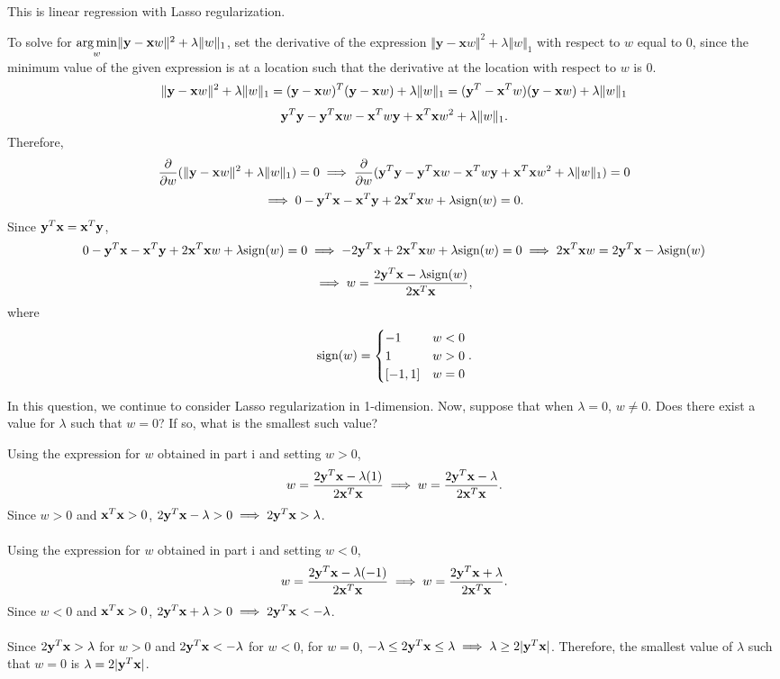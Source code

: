 This is linear regression with Lasso regularization.

To solve for $\underset{w}{\operatorname{arg\,min}} \Vert\mathbf{y} - \mathbf{x}w\Vert^2 + \lambda\Vert w\Vert_1$, set the derivative of the expression $\Vert\mathbf{y} - \mathbf{x}w\Vert^2 + \lambda\Vert w\Vert_1$ with respect to $w$ equal to 0, since the minimum value of the given expression is at a location such that the derivative at the location with respect to $w$ is 0.
\[ \Vert\mathbf{y} - \mathbf{x} w\Vert^2 + \lambda\Vert w\Vert_1 = (\mathbf{y} - \mathbf{x} w)^T(\mathbf{y} - \mathbf{x} w) + \lambda\Vert w\Vert_1 = (\mathbf{y}^T - \mathbf{x}^T w)(\mathbf{y} - \mathbf{x} w) + \lambda\Vert w\Vert_1 \]
\[ \mathbf{y}^T\mathbf{y} - \mathbf{y}^T\mathbf{x} w - \mathbf{x}^T w \mathbf{y} + \mathbf{x}^T\mathbf{x} w^2 + \lambda\Vert w\Vert_1. \]
Therefore,
\[ \frac{\partial}{\partial w}(\Vert\mathbf{y} - \mathbf{x} w\Vert^2 + \lambda\Vert w\Vert_1) = 0 \implies \frac{\partial}{\partial w}(\mathbf{y}^T\mathbf{y} - \mathbf{y}^T\mathbf{x} w - \mathbf{x}^T w \mathbf{y} + \mathbf{x}^T\mathbf{x} w^2 + \lambda\Vert w\Vert_1) = 0 \]
\[ \implies 0 - \mathbf{y}^T\mathbf{x} - \mathbf{x}^T\mathbf{y} + 2\mathbf{x}^T\mathbf{x} w + \lambda\text{sign}(w) = 0. \]
Since $\mathbf{y}^T\mathbf{x} = \mathbf{x}^T\mathbf{y}$,
\[ 0 - \mathbf{y}^T\mathbf{x} - \mathbf{x}^T\mathbf{y} + 2\mathbf{x}^T\mathbf{x} w + \lambda\text{sign}(w) = 0 \implies -2\mathbf{y}^T\mathbf{x} + 2\mathbf{x}^T\mathbf{x} w + \lambda\text{sign}(w) = 0 \implies 2\mathbf{x}^T\mathbf{x} w = 2\mathbf{y}^T\mathbf{x} - \lambda\text{sign}(w) \]
\[ \implies w = \dfrac{2\mathbf{y}^T\mathbf{x} - \lambda\text{sign}(w)}{2\mathbf{x}^T\mathbf{x}}, \]
where
\[ \text{sign}(w) =
\begin{cases} 
   -1 & w < 0 \\
   1 & w > 0 \\
   [-1, 1] & w = 0
\end{cases}. \]

\subproblem
In this question, we continue to consider Lasso regularization in 1-dimension. Now, suppose that when $\lambda = 0$, $w \neq 0$. Does there exist a value for $\lambda$ such that $w = 0$? If so, what is the smallest such value?

Using the expression for $w$ obtained in part i and setting $w > 0$,
\[ w = \dfrac{2\mathbf{y}^T\mathbf{x} - \lambda(1)}{2\mathbf{x}^T\mathbf{x}} \implies w = \dfrac{2\mathbf{y}^T\mathbf{x} - \lambda}{2\mathbf{x}^T\mathbf{x}}. \]
Since $w > 0$ and $\mathbf{x}^T\mathbf{x} > 0$, $2\mathbf{y}^T\mathbf{x} - \lambda > 0 \implies 2\mathbf{y}^T\mathbf{x} > \lambda$.\\
\\
Using the expression for $w$ obtained in part i and setting $w < 0$,
\[ w = \dfrac{2\mathbf{y}^T\mathbf{x} - \lambda(-1)}{2\mathbf{x}^T\mathbf{x}} \implies w = \dfrac{2\mathbf{y}^T\mathbf{x} + \lambda}{2\mathbf{x}^T\mathbf{x}}. \]
Since $w < 0$ and $\mathbf{x}^T\mathbf{x} > 0$, $2\mathbf{y}^T\mathbf{x} + \lambda > 0 \implies 2\mathbf{y}^T\mathbf{x} < -\lambda$.\\
\\
Since $2\mathbf{y}^T\mathbf{x} > \lambda$ for $w > 0$ and $2\mathbf{y}^T\mathbf{x} < -\lambda$ for $w < 0$, for $w = 0$, $-\lambda \leq 2\mathbf{y}^T\mathbf{x} \leq \lambda \implies \lambda \geq 2\vert \mathbf{y}^T\mathbf{x} \vert$. Therefore, the smallest value of $\lambda$ such that $w = 0$ is $\lambda = 2\vert \mathbf{y}^T\mathbf{x} \vert$.

